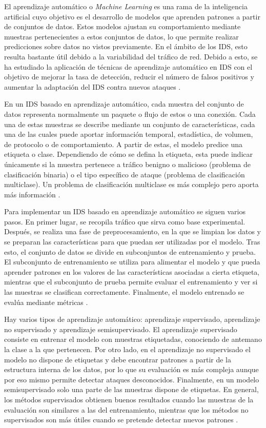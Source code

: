 El aprendizaje automático o \textit{Machine Learning} es una rama de la inteligencia artificial cuyo objetivo es el desarrollo de modelos que aprenden patrones a partir de conjuntos de datos. Estos modelos ajustan su comportamiento mediante muestras pertenecientes a estos conjuntos de datos, lo que permite realizar predicciones sobre datos no vistos previamente. En el ámbito de los IDS, esto resulta bastante útil debido a la variabilidad del tráfico de red. Debido a esto, se ha estudiado la aplicación de técnicas de aprendizaje automático en IDS con el objetivo de mejorar la tasa de detección, reducir el número de falsos positivos y aumentar la adaptación del IDS contra nuevos ataques \cite{zamani2015mlids,buczak2016survey}.

En un IDS basado en aprendizaje automático, cada muestra del conjunto de datos representa normalmente un paquete o flujo de estos o una conexión. Cada una de estas muestras se describe mediante un conjunto de características, cada una de las cuales puede aportar información temporal, estadística, de volumen, de protocolo o de comportamiento. A partir de estas, el modelo predice una etiqueta o clase. Dependiendo de cómo se defina la etiqueta, esta puede indicar únicamente si la muestra pertenece a tráfico benigno o malicioso (problema de clasificación binaria) o el tipo específico de ataque (problema de clasificación multiclase). Un problema de clasificación multiclase es más complejo pero aporta más información \cite{wagh2013surveyids}.

Para implementar un IDS basado en aprendizaje automático se siguen varios pasos. En primer lugar, se recopila tráfico que sirva como base experimental. Después, se realiza una fase de preprocesamiento, en la que se limpian los datos y se preparan las características para que puedan ser utilizadas por el modelo. Tras esto, el conjunto de datos se divide en subconjuntos de entrenamiento y prueba. El subconjunto de entrenamiento se utiliza para alimentar el modelo y que pueda aprender patrones en los valores de las características asociadas a cierta etiqueta, mientras que el subconjunto de prueba permite evaluar el entrenamiento y ver si las muestras se clasifican correctamente. Finalmente, el modelo entrenado se evalúa mediante métricas \cite{buczak2016survey}.

Hay varios tipos de aprendizaje automático: aprendizaje supervisado, aprendizaje no supervisado y aprendizaje semisupervisado. El aprendizaje supervisado consiste en entrenar el modelo con muestras etiquetadas, conociendo de antemano la clase a la que pertenecen. Por otro lado, en el aprendizaje no supervisado el modelo no dispone de etiquetas y debe encontrar patrones a partir de la estructura interna de los datos, por lo que su evaluación es más compleja aunque por eso mismo permite detectar ataques desconocidos. Finalmente, en un modelo semisupervisado solo una parte de las muestras dispone de etiquetas. En general, los métodos supervisados obtienen buenos resultados cuando las muestras de la evaluación son similares a las del entrenamiento, mientras que los métodos no supervisados son más útiles cuando se pretende detectar nuevos patrones \cite{zamani2015mlids,kunal2019mlids}.

